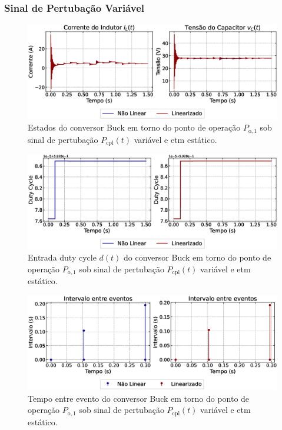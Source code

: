 \subsubsection{Sinal de Pertubação Variável}

\begin{figure}[H]
  \centering
  \captionsetup{justification=centering}
  \includegraphics[width=1.\textwidth]{figuras/static-etm/buck/sim2/op1/result.eps}
  \caption{Estados do conversor Buck em torno do ponto de operação $P_{\mathrm{o}, 1}$ sob sinal de pertubação $P_{\mathrm{cpl}}(t)$ variável e \acrshort{etm} estático.}
\end{figure}

\begin{figure}[H]
  \centering
  \captionsetup{justification=centering}
  \includegraphics[width=1.\textwidth]{figuras/static-etm/buck/sim2/op1/duty-cycle.eps}
  \caption{Entrada duty cycle $d(t)$ do conversor Buck em torno do ponto de operação $P_{\mathrm{o}, 1}$ sob sinal de pertubação $P_{\mathrm{cpl}}(t)$ variável e \acrshort{etm} estático.}
\end{figure}

\begin{figure}[H]
  \centering
  \captionsetup{justification=centering}
  \includegraphics[width=1.\textwidth]{figuras/static-etm/buck/sim2/op1/inter-event-times.eps}
  \caption{Tempo entre evento do conversor Buck em torno do ponto de operação $P_{\mathrm{o}, 1}$ sob sinal de pertubação $P_{\mathrm{cpl}}(t)$ variável e \acrshort{etm} estático.}
\end{figure}

